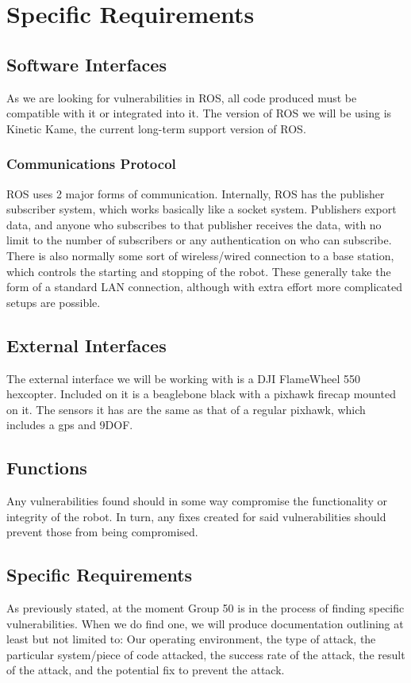 \documentclass{scrreprt}
\begin{document}
\chapter{Specific Requirements}

\section{Software Interfaces}
As we are looking for vulnerabilities in ROS, all code produced must be compatible with it or integrated into it. The version of ROS we will be using is Kinetic Kame, the current long-term support version of ROS.

\subsection{Communications Protocol}
ROS uses 2 major forms of communication. Internally, ROS has the publisher subscriber system, which works basically like a socket system.
Publishers export data, and anyone who subscribes to that publisher receives the data, with no limit to the number of
subscribers or any authentication on who can subscribe. There is also normally some sort of wireless/wired connection to a base
station, which controls the starting and stopping of the robot. These generally take the form of a standard LAN connection,
although with extra effort more complicated setups are possible.

\section{External Interfaces}
The external interface we will be working with is a DJI FlameWheel 550 hexcopter.
Included on it is a beaglebone black with a pixhawk firecap mounted on it.
The sensors it has are the same as that of a regular pixhawk, which includes a gps and 9DOF.

\section{Functions}
Any vulnerabilities found should in some way compromise the functionality or integrity of the robot. In turn, any fixes created for said vulnerabilities should prevent those from being compromised.

\section{Specific Requirements}
As previously stated, at the moment Group 50 is in the process of finding specific vulnerabilities. When we do find one, we will produce documentation outlining at least but not limited to:
Our operating environment, the type of attack, the particular system/piece of code attacked, the success rate of the attack, the result of the attack, and the potential fix to prevent the attack.
\end{document}

